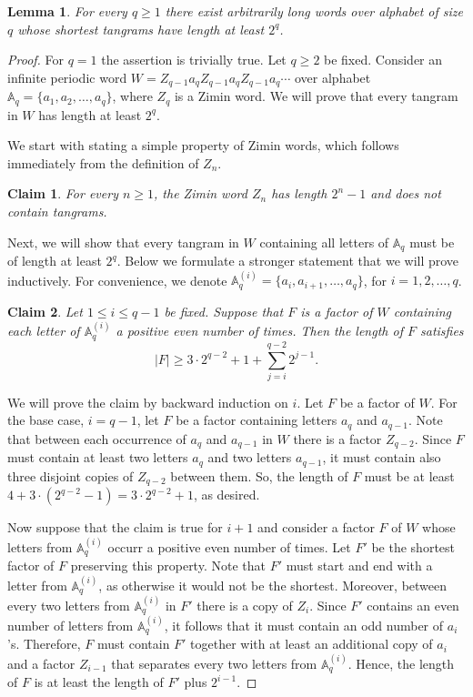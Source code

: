 \documentclass[12pt]{amsart}
\theoremstyle{plain}
\newtheorem{claim}{Claim}
\newtheorem{lemma}{Lemma}
\numberwithin{equation}{section}
\begin{document}
\begin{lemma}
	\label{lemma_avoid_short_tangrams}
	For every $q\geqslant1$ there exist arbitrarily long words over alphabet of size $q$ whose shortest tangrams have length at least $2^q$.
\end{lemma}
\begin{proof}
	For $q=1$ the assertion is trivially true. Let $q\geqslant2$ be fixed. Consider an infinite periodic word $W=Z_{q-1}a_qZ_{q-1}a_qZ_{q-1}a_q\cdots$ over alphabet $\mathbb{A}_q=\{a_1, a_2, \ldots, a_q\}$, where $Z_q$ is a Zimin word. We will prove that every tangram in $W$ has length at least $2^q$. 
	
	We start with stating a simple property of Zimin words, which follows immediately from the definition of $Z_n$.
	 
	\begin{claim}
		\label{claim_notangramsinzimin}
		For every $n\geqslant 1$, the Zimin word $Z_n$ has length $2^n-1$ and does not contain tangrams.
	\end{claim}
	
	Next, we will show that every tangram in $W$ containing all letters of $\mathbb{A}_q$ must be of length at least $2^q$. Below we formulate a stronger statement that we will prove inductively. For convenience, we denote $\mathbb{A}^{(i)}_q=\{a_i, a_{i+1},\ldots, a_q \}$, for $i=1,2,\ldots, q$.
	
	\begin{claim}
		\label{claim_longtangramsinW}
		Let $1\leqslant i\leqslant q-1$ be fixed. Suppose that $F$ is a factor of $W$ containing each letter of $\mathbb{A}^{(i)}_q$ a positive even number of times. Then the length of $F$ satisfies $$|F|\geqslant 3\cdot 2^{q-2}+1+\sum_{j=i}^{q-2}2^{j-1}.$$
	\end{claim}
	We will prove the claim by backward induction on $i$. Let $F$ be a factor of $W$. For the base case, $i=q-1$, let $F$ be a factor containing letters $a_q$ and $a_{q-1}$. Note that between each occurrence of $a_q$ and $a_{q-1}$ in $W$ there is a factor $Z_{q-2}$. Since $F$ must contain at least two letters $a_q$ and two letters $a_{q-1}$, it must contain also three disjoint copies of $Z_{q-2}$ between them. So, the length of $F$ must be at least $4 + 3\cdot\left(2^{q-2} - 1\right)= 3\cdot 2^{q-2} + 1$, as desired.
	
	Now suppose that the claim is true for $i+1$ and consider a factor $F$ of $W$ whose letters from $\mathbb{A}^{(i)}_q$ occurr a positive even number of times. Let $F'$ be the shortest factor of $F$ preserving this property. Note that $F'$ must start and end with a letter from $\mathbb{A}^{(i)}_q$, as otherwise it would not be the shortest. Moreover, between every two letters from $\mathbb{A}^{(i)}_q$ in $F'$ there is a copy of $Z_{i}$. Since $F'$ contains an even number of letters from $\mathbb{A}^{(i)}_q$, it follows that it must contain an odd number of $a_i$'s. Therefore, $F$ must contain $F'$ together with at least an additional copy of $a_i$ and a factor $Z_{i-1}$ that separates every two letters from $\mathbb{A}^{(i)}_q$. Hence, the length of $F$ is at least the length of $F'$ plus $2^{i-1}$.
	

\end{proof}
\end{document}
